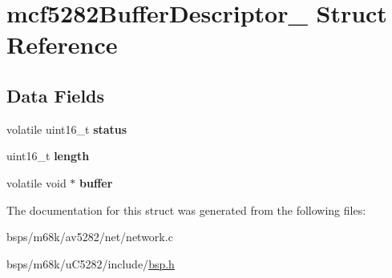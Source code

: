 \hypertarget{structmcf5282BufferDescriptor__}{}\section{mcf5282\+Buffer\+Descriptor\+\_\+ Struct Reference}
\label{structmcf5282BufferDescriptor__}
\subsection*{Data Fields}
\begin{DoxyCompactItemize}
\item 
\mbox{\label{structmcf5282BufferDescriptor___a8e768f90e447881168d24071f2fc188c}} 
volatile uint16\+\_\+t {\bfseries status}
\item 
\mbox{\label{structmcf5282BufferDescriptor___a20f629801612a65914b6300b03008014}} 
uint16\+\_\+t {\bfseries length}
\item 
\mbox{\label{structmcf5282BufferDescriptor___afc0fa6147c6e6384c06d2e09f97b8de3}} 
volatile void $\ast$ {\bfseries buffer}
\end{DoxyCompactItemize}


The documentation for this struct was generated from the following files\+:\begin{DoxyCompactItemize}
\item 
bsps/m68k/av5282/net/network.\+c\item 
bsps/m68k/u\+C5282/include/\mbox{\hyperlink{bsps_2m68k_2uC5282_2include_2bsp_8h}{bsp.\+h}}\end{DoxyCompactItemize}

